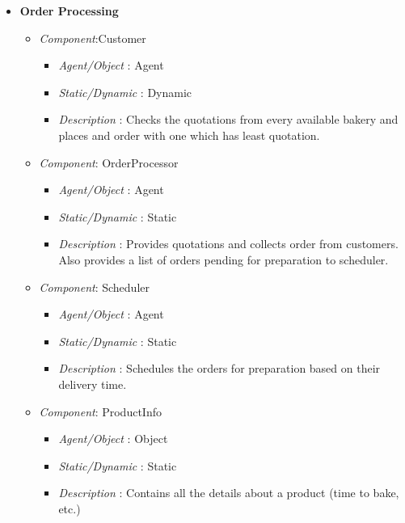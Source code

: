 \documentclass[11pt, a4paper]{article}
\begin{document}
\begin{itemize}
	\item \textbf{Order Processing}
	\begin{itemize}
	\item \textit{Component}:Customer
	\begin{itemize}
		\item \textit{Agent/Object} : Agent
		\item \textit{Static/Dynamic} : Dynamic
		\item \textit{Description} : Checks the quotations from every available bakery and places and order with one which has least quotation.
	\end{itemize}
	\item \textit{Component}: OrderProcessor
	\begin{itemize}
		\item \textit{Agent/Object} : Agent
		\item \textit{Static/Dynamic} : Static
		\item \textit{Description} : Provides quotations and collects order from customers. Also provides a list of orders pending for preparation to scheduler.
	\end{itemize}
	\item \textit{Component}: Scheduler
	\begin{itemize}
		\item \textit{Agent/Object} : Agent
		\item \textit{Static/Dynamic} : Static
		\item \textit{Description} : Schedules the orders for preparation based on their delivery time.
	\end{itemize}
	\item \textit{Component}: ProductInfo
	\begin{itemize}
		\item \textit{Agent/Object} : Object
		\item \textit{Static/Dynamic} : Static
		\item \textit{Description} : Contains all the details about a product (time to bake, etc.)
	\end{itemize}
	\end{itemize}


\end{itemize}
\end{document}
